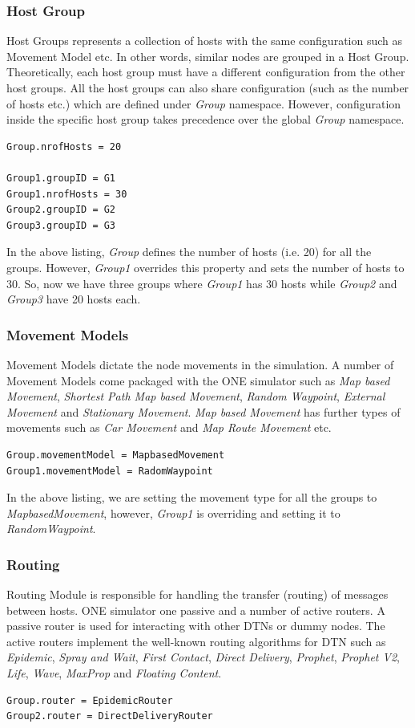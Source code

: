 \subsubsection{Host Group}
Host Groups represents a collection of hosts with the same configuration such as Movement Model etc. In other words, similar nodes are grouped in a Host Group. Theoretically, each host group must have a different configuration from the other host groups. All the host groups can also share configuration (such as the number of hosts etc.) which are defined under \textit{Group} namespace. However, configuration inside the specific host group takes precedence over the global \textit{Group} namespace.
\begin{lstlisting}[language=bash]
Group.nrofHosts = 20

Group1.groupID = G1
Group1.nrofHosts = 30
Group2.groupID = G2
Group3.groupID = G3
\end{lstlisting}

In the above listing, \textit{Group} defines the number of hosts (i.e. 20) for all the groups. However, \textit{Group1} overrides this property and sets the number of hosts to 30. So, now we have three groups where \textit{Group1} has 30 hosts while \textit{Group2} and \textit{Group3} have 20 hosts each.

\subsubsection{Movement Models}
Movement Models dictate the node movements in the simulation. A number of Movement Models come packaged with the ONE simulator such as \textit{Map based Movement}, \textit{Shortest Path Map based Movement}, \textit{Random Waypoint}, \textit{External Movement} and \textit{Stationary Movement}. \textit{Map based Movement} has further types of movements such as \textit{Car Movement} and \textit{Map Route Movement} etc.
\begin{lstlisting}[language=bash]
Group.movementModel = MapbasedMovement
Group1.movementModel = RadomWaypoint
\end{lstlisting}

In the above listing, we are setting the movement type for all the groups to \textit{MapbasedMovement}, however, \textit{Group1} is overriding and setting it to \textit{RandomWaypoint}.

\subsubsection{Routing}
Routing Module is responsible for handling the transfer (routing) of messages between hosts. ONE simulator one passive and a number of active routers. A passive router is used for interacting with other DTNs or dummy nodes. The active routers implement the well-known routing algorithms for DTN such as \textit{Epidemic}, \textit{Spray and Wait}, \textit{First Contact}, \textit{Direct Delivery}, \textit{Prophet}, \textit{Prophet V2}, \textit{Life}, \textit{Wave}, \textit{MaxProp} and \textit{Floating Content}.
\begin{lstlisting}[language=bash]
Group.router = EpidemicRouter
Group2.router = DirectDeliveryRouter
\end{lstlisting}

